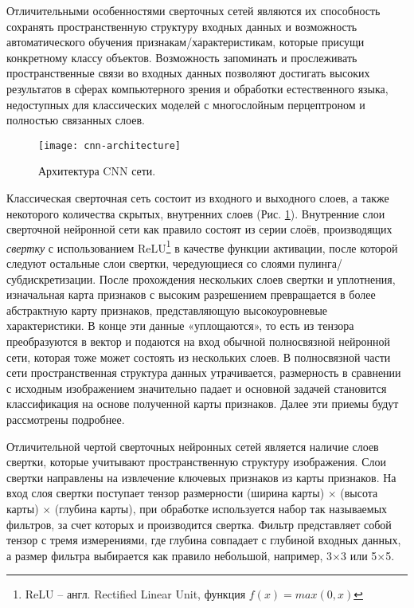 Отличительными особенностями сверточных сетей являются их способность сохранять пространственную структуру входных данных и возможность автоматического обучения признакам/характеристикам, которые присущи конкретному классу объектов. Возможность запоминать и прослеживать пространственные связи во входных данных позволяют достигать высоких результатов в сферах компьютерного зрения и обработки естественного языка, недоступных для классических моделей с многослойным перцептроном и полностью связанных слоев.

\begin{figure}[h]
	\centering
	\texttt{[image: cnn-architecture]}
	\caption{Архитектура CNN сети.}
	\label{fig:cnn-architecture}
\end{figure}

Классическая сверточная сеть состоит из входного и выходного слоев, а также некоторого количества скрытых, внутренних слоев (Рис. \ref{fig:cnn-architecture}). Внутренние слои сверточной нейронной сети как правило состоят из серии слоёв, производящих \emph{свертку} с использованием ReLU\footnote{ReLU -- англ. Rectified Linear Unit, функция $f(x)=max(0,x)$} в качестве функции активации, после которой следуют остальные слои свертки, чередующиеся со слоями пулинга/субдискретизации. После прохождения нескольких слоев свертки и уплотнения, изначальная карта признаков с высоким разрешением превращается в более абстрактную карту признаков, представляющую высокоуровневые характеристики. В конце эти данные «уплощаются», то есть из тензора преобразуются в вектор и подаются на вход обычной полносвязной нейронной сети, которая тоже может состоять из нескольких слоев. В полносвязной части сети пространственная структура данных утрачивается, размерность в сравнении с исходным изображением значительно падает и основной задачей становится классификация на основе полученной карты признаков. Далее эти приемы будут рассмотрены подробнее.

Отличительной чертой сверточных нейронных сетей является наличие слоев свертки, которые учитывают пространственную структуру изображения. Слои свертки направлены на извлечение ключевых признаков из карты признаков. На вход слоя свертки поступает тензор размерности (ширина карты) $\times$ (высота карты) $\times$ (глубина карты), при обработке используется набор так называемых фильтров, за счет которых и производится свертка. Фильтр представляет собой тензор с тремя измерениями, где глубина совпадает с глубиной входных данных, а размер фильтра выбирается как правило небольшой, например, 3$\times$3 или 5$\times$5.

